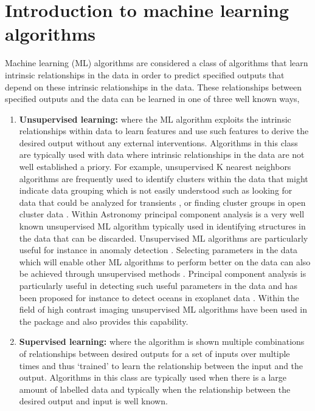 \chapter{Introduction to machine learning algorithms}
\label{chap:III.2}
Machine learning (ML) algorithms are considered a class of algorithms that learn intrinsic relationships in the data in order to predict specified outputs that depend on these intrinsic relationships in the data.
These relationships between specified outputs and the data can be learned in one of three well known ways,
\begin{enumerate}
    \item \textbf{Unsupervised learning:} where the ML algorithm exploits the intrinsic relationships within data to learn features and use such features to derive the desired output without any external interventions.
    Algorithms in this class are typically used with data where intrinsic relationships in the data are not well established a priory.
    For example, unsupervised K nearest neighbors algorithms are frequently used to identify clusters within the data that might indicate data grouping which is not easily understood such as looking for data that could be analyzed for transients \citep[e.g][]{2022AleoTransients}, or finding cluster groups in open cluster data \citep[e.g][]{2022cluster}.
    Within Astronomy principal component analysis is a very well known unsupervised ML algorithm typically used in identifying structures in the data that can be discarded.
    Unsupervised ML algorithms are particularly useful for instance in anomaly detection \cite{2023EJASPanomaly}.
    Selecting parameters in the data which will enable other ML algorithms to perform better on the data can also be achieved through unsupervised methods \cite{2023PatRe.14209676H}.
    Principal component analysis is particularly useful in detecting such useful parameters in the data and has been proposed for instance to detect oceans in exoplanet data \citep[e.g][]{2022RyanOCeans}.
    Within the field of high contrast imaging unsupervised ML algorithms have been used in the package \citep[PACO,][]{2023Chomez} and \citep[VIP, ][]{2023Christiaens} also provides this capability. 
    \item \textbf{Supervised learning:} where the algorithm is shown multiple combinations of relationships between desired outputs for a set of inputs over multiple times and thus `trained' to learn the relationship between the input and the output.
    Algorithms in this class are typically used when there is a large amount of labelled data and typically when the relationship between the desired output and input is well known.

\end{enumerate}

